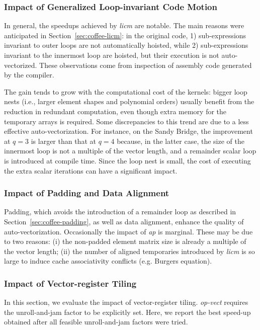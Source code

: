\subsubsection{Impact of Generalized Loop-invariant Code Motion}
\label{sec:perf-eval-licm}

In general, the speedups achieved by \emph{licm} are notable. The main reasons were anticipated in Section~\ref{sec:coffee-licm}: in the original code, 1) sub-expressions invariant to outer loops are not automatically hoisted, while 2) sub-expressions invariant to the innermost loop are hoisted, but their execution is not auto-vectorized. These observations come from inspection of assembly code generated by the compiler.

The gain tends to grow with the computational cost of the kernels: bigger loop nests (i.e., larger element shapes and polynomial orders) usually benefit from the reduction in redundant computation, even though extra memory for the temporary arrays is required. Some discrepancies to this trend are due to a less effective auto-vectorization. For instance, on the Sandy Bridge, the improvement at $q=3$ is larger than that at $q=4$ because, in the latter case, the size of the innermost loop is not a multiple of the vector length, and a remainder scalar loop is introduced at compile time. Since the loop nest is small, the cost of executing the extra scalar iterations can have a significant impact.

\subsubsection{Impact of Padding and Data Alignment}
\label{sec:perf-eval-padding}

Padding, which avoids the introduction of a remainder loop as described in Section~\ref{sec:coffee-padding}, as well as data alignment, enhance the quality of auto-vectorization. Occasionally the impact of \emph{ap} is marginal. These may be due to two reasons: (i) the non-padded element matrix size is already a multiple of the vector length; (ii) the number of aligned temporaries introduced by \emph{licm} is so large to induce cache associativity conflicts (e.g. Burgers equation).

\subsubsection{Impact of Vector-register Tiling}
\label{sec:perf-eval-opvect}

In this section, we evaluate the impact of vector-register tiling. \emph{op-vect} requires the unroll-and-jam factor to be explicitly set. Here, we report the best speed-up obtained after all feasible unroll-and-jam factors were tried. 

